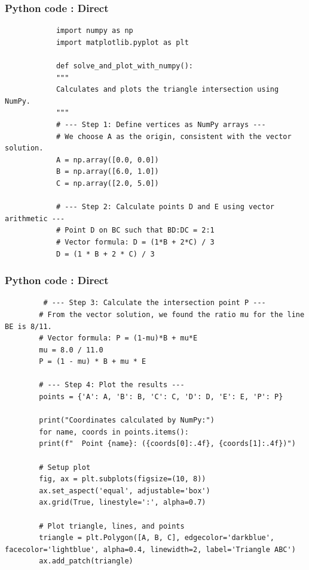 \documentclass{beamer}
\begin{document}
	\begin{frame}[fragile]
		\frametitle{Python code : Direct }
		
		\begin{lstlisting}
			import numpy as np
			import matplotlib.pyplot as plt
			
			def solve_and_plot_with_numpy():
			"""
			Calculates and plots the triangle intersection using NumPy.
			"""
			# --- Step 1: Define vertices as NumPy arrays ---
			# We choose A as the origin, consistent with the vector solution.
			A = np.array([0.0, 0.0])
			B = np.array([6.0, 1.0])
			C = np.array([2.0, 5.0])
			
			# --- Step 2: Calculate points D and E using vector arithmetic ---
			# Point D on BC such that BD:DC = 2:1
			# Vector formula: D = (1*B + 2*C) / 3
			D = (1 * B + 2 * C) / 3
		\end{lstlisting}
	\end{frame}
	\begin{frame}[fragile]
		\frametitle{Python code : Direct }
		
		\begin{lstlisting}
		 # --- Step 3: Calculate the intersection point P ---
		# From the vector solution, we found the ratio mu for the line BE is 8/11.
		# Vector formula: P = (1-mu)*B + mu*E
		mu = 8.0 / 11.0
		P = (1 - mu) * B + mu * E
		
		# --- Step 4: Plot the results ---
		points = {'A': A, 'B': B, 'C': C, 'D': D, 'E': E, 'P': P}
		
		print("Coordinates calculated by NumPy:")
		for name, coords in points.items():
		print(f"  Point {name}: ({coords[0]:.4f}, {coords[1]:.4f})")
		
		# Setup plot
		fig, ax = plt.subplots(figsize=(10, 8))
		ax.set_aspect('equal', adjustable='box')
		ax.grid(True, linestyle=':', alpha=0.7)
		
		# Plot triangle, lines, and points
		triangle = plt.Polygon([A, B, C], edgecolor='darkblue', facecolor='lightblue', alpha=0.4, linewidth=2, label='Triangle ABC')
		ax.add_patch(triangle)
		\end{lstlisting}
	\end{frame}
\end{document}
